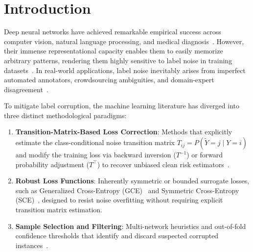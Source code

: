 \documentclass[10pt,twocolumn]{article}
\theoremstyle{definition}
\begin{document}
\section{Introduction}
Deep neural networks have achieved remarkable empirical success across computer vision, natural language processing, and medical diagnosis~\cite{he2016identity,zhang2017understanding}. However, their immense representational capacity enables them to easily memorize arbitrary patterns, rendering them highly sensitive to label noise in training datasets~\cite{zhang2017understanding,arpit2017closer}. In real-world applications, label noise inevitably arises from imperfect automated annotators, crowdsourcing ambiguities, and domain-expert disagreement~\cite{song2022learning,wei2022learning}.

To mitigate label corruption, the machine learning literature has diverged into three distinct methodological paradigms:
\begin{enumerate}
    \item \textbf{Transition-Matrix-Based Loss Correction}: Methods that explicitly estimate the class-conditional noise transition matrix $T_{ij} = P(\tilde{Y}=j \mid Y=i)$ and modify the training loss via backward inversion ($T^{-1}$) or forward probability adjustment ($T^\top$) to recover unbiased clean risk estimators~\cite{natarajan2013learning,patrini2017making,xia2019are}.
    \item \textbf{Robust Loss Functions}: Inherently symmetric or bounded surrogate losses, such as Generalized Cross-Entropy (GCE)~\cite{zhang2018generalized} and Symmetric Cross-Entropy (SCE)~\cite{wang2019symmetric}, designed to resist noise overfitting without requiring explicit transition matrix estimation.
    \item \textbf{Sample Selection and Filtering}: Multi-network heuristics and out-of-fold confidence thresholds that identify and discard suspected corrupted instances~\cite{han2018co,li2020dividemix,northcutt2021confident}.
\end{enumerate}
\end{document}
